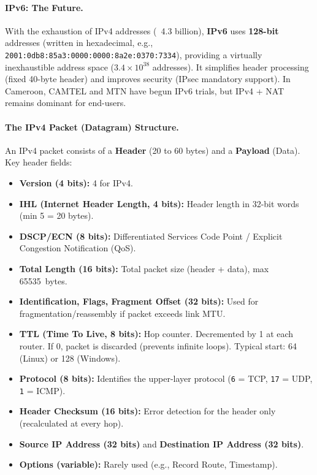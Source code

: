 \documentclass[11pt]{article}
\begin{document}
\paragraph{IPv6: The Future.}
With the exhaustion of IPv4 addresses (~4.3 billion), \textbf{IPv6} uses \textbf{128-bit} addresses (written in hexadecimal, e.g., \texttt{2001:0db8:85a3:0000:0000:8a2e:0370:7334}), providing a virtually inexhaustible address space ($3.4 \times 10^{38}$ addresses). It simplifies header processing (fixed 40-byte header) and improves security (IPsec mandatory support). In Cameroon, CAMTEL and MTN have begun IPv6 trials, but IPv4 + NAT remains dominant for end-users.

\paragraph{The IPv4 Packet (Datagram) Structure.}
An IPv4 packet consists of a \textbf{Header} (20 to 60 bytes) and a \textbf{Payload} (Data).
Key header fields:
\begin{itemize}
    \item \textbf{Version (4 bits):} 4 for IPv4.
    \item \textbf{IHL (Internet Header Length, 4 bits):} Header length in 32-bit words (min 5 = 20 bytes).
    \item \textbf{DSCP/ECN (8 bits):} Differentiated Services Code Point / Explicit Congestion Notification (QoS).
    \item \textbf{Total Length (16 bits):} Total packet size (header + data), max \SI{65535}{bytes}.
    \item \textbf{Identification, Flags, Fragment Offset (32 bits):} Used for fragmentation/reassembly if packet exceeds link MTU.
    \item \textbf{TTL (Time To Live, 8 bits):} Hop counter. Decremented by 1 at each router. If 0, packet is discarded (prevents infinite loops). Typical start: 64 (Linux) or 128 (Windows).
    \item \textbf{Protocol (8 bits):} Identifies the upper-layer protocol (\texttt{6} = TCP, \texttt{17} = UDP, \texttt{1} = ICMP).
    \item \textbf{Header Checksum (16 bits):} Error detection for the header only (recalculated at every hop).
    \item \textbf{Source IP Address (32 bits)} and \textbf{Destination IP Address (32 bits)}.
    \item \textbf{Options (variable):} Rarely used (e.g., Record Route, Timestamp).
\end{itemize}
\end{document}
